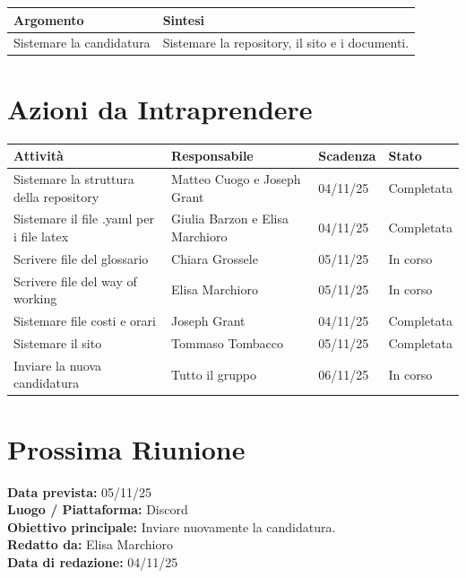 \documentclass[a4paper,12pt]{article}
\begin{document}
\begin{longtable}{|p{}|p{}|}
\hline
\textbf{Argomento} & \textbf{Sintesi} \\ \hline
Sistemare la candidatura & Sistemare la repository, il sito e i documenti. \\ \hline

\end{longtable}

\pagebreak
\section*{ Azioni da Intraprendere}

\begin{longtable}{|p{}|p{}|p{}|p{}|}
\hline
\textbf{Attività} & \textbf{Responsabile} & \textbf{Scadenza} & \textbf{Stato} \\ \hline
Sistemare la struttura della repository & Matteo Cuogo e Joseph Grant & 04/11/25 & Completata \\ \hline
Sistemare il file .yaml per i file latex & Giulia Barzon e Elisa Marchioro & 04/11/25 & Completata \\ \hline
Scrivere file del glossario & Chiara Grossele & 05/11/25 & In corso \\ \hline
Scrivere file del way of working & Elisa Marchioro & 05/11/25 & In corso \\ \hline
Sistemare file costi e orari & Joseph Grant & 04/11/25 & Completata \\ \hline
Sistemare il sito & Tommaso Tombacco & 05/11/25 & Completata \\ \hline
Inviare la nuova candidatura & Tutto il gruppo & 06/11/25 & In corso \\ \hline
\end{longtable}


\section*{ Prossima Riunione}
\textbf{Data prevista:} 05/11/25 \\
\textbf{Luogo / Piattaforma:} Discord \\
\textbf{Obiettivo principale:} Inviare nuovamente la candidatura. \\
\textbf{Redatto da:} Elisa Marchioro \\
\textbf{Data di redazione:} 04/11/25
\end{document}
